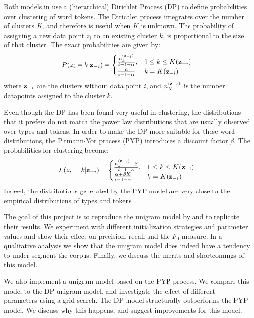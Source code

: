 Both models in \cite{Goldwater200921} use a (hierarchical) Dirichlet Process (DP) to define probabilities over clustering of word tokens. The Dirichlet process integrates over the number of clusters $K$, and therefore is useful when $K$ is unknown. The probability of assigning a new data point $z_i$ to an existing cluster $k$, is proportional to the size of that cluster. The exact probabilities are given by:
\begin{align}
P(z_i=k|\bm{\mathbf{z}}_{-i}) = 
\begin{cases}
    \frac{n_k^{(\bm{\mathbf{z}}_{-i})}}{i - 1 - \alpha},& 1 \le k \le K(\bm{\mathbf{z}}_{-i})\\
    \frac{\alpha}{i - 1 - \alpha}              & k = K(\bm{\mathbf{z}}_{-i})\\
\end{cases} \label{eq:DP}
\end{align}
where $\bm{\mathbf{z}}_{-i}$ are the clusters without data point $i$, and $n_K^{(\bm{\mathbf{z}}_{-i})}$ is the number datapoints assigned to the cluster $k$.

Even though the DP has been found very useful in clustering, the distributions that it prefers do not match the power law distributions that are usually observed over types and tokens. In order to make the DP more suitable for these word distributions, the Pitmann-Yor process (PYP) \cite{pitman1997two} introduces a discount factor $\beta$. The probabilities for clustering become:
\begin{align}
P(z_i=k|\bm{\mathbf{z}}_{-i}) = 
\begin{cases}
    \frac{n_k^{(\bm{\mathbf{z}}_{-i})} - \beta}{i - 1 - \alpha},& 1 \le k \le K(\bm{\mathbf{z}}_{-i})\\
    \frac{\alpha + \beta K}{i - 1 - \alpha}              & k = K(\bm{\mathbf{z}}_{-i})\\
\end{cases}  \label{eq:PYP}
\end{align}
Indeed, the distributions generated by the PYP model are very close to the empirical distributions of types and tokens \cite{goldwater2005interpolating}.


The goal of this project is to reproduce the unigram model by \cite{Goldwater200921} and to replicate their results. We experiment with different initialization strategies and parameter values and show their effect on precision, recall and the $F_0$-measure. In a qualitative analysis we show that the unigram model does indeed have a tendency to under-segment the corpus. Finally, we discuss the merits and shortcomings of this model. 

We also implement a unigram model based on the PYP process. We compare this model to the DP unigram model, and investigate the effect of different parameters using a grid search. The DP model structurally outperforms the PYP model. We discuss why this happens, and suggest improvements for this model.
